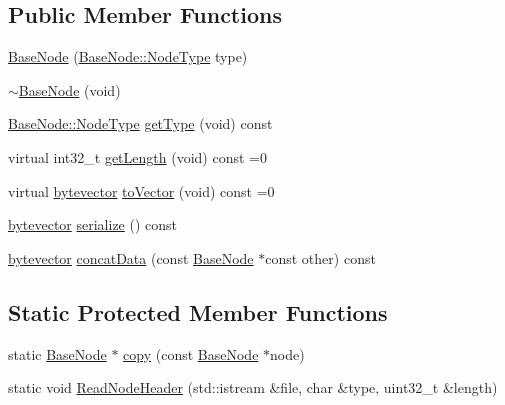 \subsection*{Public Member Functions}
\begin{DoxyCompactItemize}
\item 
\hyperlink{class_base_node_afc5bd25898054b2e50d6b01451d73b1b}{Base\-Node} (\hyperlink{class_base_node_a01f9336072c3fb197a2a0dda45d78544}{Base\-Node\-::\-Node\-Type} type)
\item 
\hyperlink{class_base_node_a27d5e3b508b19fa7887ac95d15a46f9c}{$\sim$\-Base\-Node} (void)
\item 
\hyperlink{class_base_node_a01f9336072c3fb197a2a0dda45d78544}{Base\-Node\-::\-Node\-Type} \hyperlink{class_base_node_a080bb4228cc6b0239f29c033257c486e}{get\-Type} (void) const 
\item 
virtual int32\-\_\-t \hyperlink{class_base_node_a50aef77f988f7689e96b346705628f91}{get\-Length} (void) const =0
\item 
virtual \hyperlink{types_8h_a64b5be62be31dcda165d2c6c3c262fb5}{bytevector} \hyperlink{class_base_node_aad2eb87014be9a786ec9a4c4ac405c45}{to\-Vector} (void) const =0
\item 
\hyperlink{types_8h_a64b5be62be31dcda165d2c6c3c262fb5}{bytevector} \hyperlink{class_base_node_aa5206e6e347794cba4068ddd90b8a091}{serialize} () const 
\item 
\hyperlink{types_8h_a64b5be62be31dcda165d2c6c3c262fb5}{bytevector} \hyperlink{class_base_node_ab9ec930839c38803c8be0638c7096982}{concat\-Data} (const \hyperlink{class_base_node}{Base\-Node} $\ast$const other) const 
\end{DoxyCompactItemize}
\subsection*{Static Protected Member Functions}
\begin{DoxyCompactItemize}
\item 
static \hyperlink{class_base_node}{Base\-Node} $\ast$ \hyperlink{class_base_node_ae7b4733f4f9eae9979dc9d8469d51c28}{copy} (const \hyperlink{class_base_node}{Base\-Node} $\ast$node)
\item 
static void \hyperlink{class_base_node_ae2e188a31e6eb5d04caa4e57314a7f51}{Read\-Node\-Header} (std\-::istream \&file, char \&type, uint32\-\_\-t \&length)
\end{DoxyCompactItemize}


